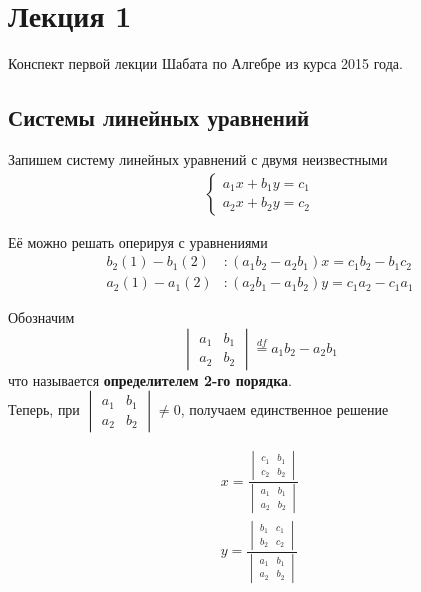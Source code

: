 \documentclass{article}
\begin{document}
\newcommand{\df}{\overset{df}{=}}

\tableofcontents
\pagebreak
\section{Лекция 1}
Конспект первой лекции Шабата по Алгебре из курса 2015 года.

\subsection{Системы линейных уравнений}

Запишем систему линейных уравнений с двумя неизвестными
\begin{gather}
    \begin{cases} 
        a_1 x + b_1 y  = c_1\\ 
        a_2 x + b_2 y  = c_2 
    \end{cases}
\end{gather}

Её можно решать оперируя с уравнениями 
\begin{align*}
b_2 (1) - b_1 (2) &: (a_1 b_2 - a_2 b_1 )x = c_1 b_2 - b_1 c_2 \\
a_2 (1) - a_1 (2) &: (a_2 b_1 - a_1 b_2 )y = c_1 a_2 - c_1  a_1   
\end{align*}

Обозначим 
\begin{equation*}
    \begin{vmatrix}
        a_1 & b_1 \\
        a_2 & b_2
    \end{vmatrix} \df a_1 b_2 - a_2 b_1 
\end{equation*}
что называется \textbf{определителем 2-го порядка}.
\\Теперь, при 
$
\begin{vmatrix}
    a_1 & b_1 \\
    a_2 & b_2
\end{vmatrix} \neq 0 $, получаем единственное решение

\begin{gather}
        x = \frac{
            \begin{vmatrix}
                c_1 & b_1 \\
                c_2 & b_2
            \end{vmatrix}
        }{
            \begin{vmatrix}
                a_1 & b_1 \\
                a_2 & b_2
            \end{vmatrix}
        } \\
        y = \frac{
            \begin{vmatrix}
                b_1 & c_1 \\
                b_2 & c_2
            \end{vmatrix}
        }{
            \begin{vmatrix}
                a_1 & b_1 \\
                a_2 & b_2
            \end{vmatrix}
        }
\end{gather}
\end{document}
